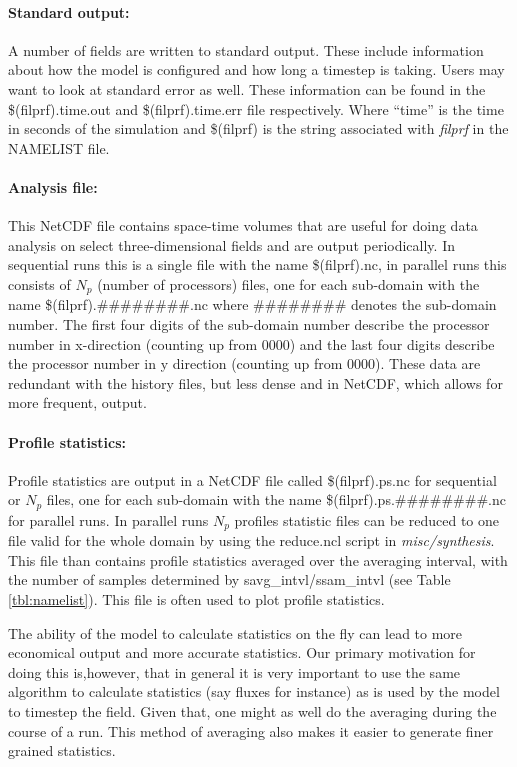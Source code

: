 \documentclass[11pt,a4paper]{article}
\begin{document}
\paragraph{Standard output:}  A number of fields are written to
standard output. These include information about how the model is
configured and how long a timestep is taking. Users may want to look
at standard error as well. These information can be found in the
\$(filprf).time.out and \$(filprf).time.err file respectively.
Where ``time'' is the time in seconds of the simulation and
\$(filprf) is the string associated with \emph{filprf} in
the NAMELIST file.

\paragraph{Analysis file:}  This NetCDF file contains space-time
volumes that are useful for doing data analysis on select 
three-dimensional fields and are output periodically.
In sequential runs this is a single file with the name \$(filprf).nc,
in parallel runs this consists of $N_p$ (number of processors) files,
one for each sub-domain with the name \$(filprf).\#\#\#\#\#\#\#\#.nc
where \#\#\#\#\#\#\#\# denotes the sub-domain number. The first four
digits of the sub-domain number describe the processor number in
x-direction (counting up from 0000) and the last four digits describe
the processor number in y direction (counting up from 0000).
These data are redundant with the history files, but less dense and
in NetCDF, which allows for more frequent, output.

\paragraph{Profile statistics:}  Profile statistics are output in a
NetCDF file called \$(filprf).ps.nc for sequential or $N_p$ files,
one for each sub-domain with the name \$(filprf).ps.\#\#\#\#\#\#\#\#.nc
for parallel runs. In parallel runs $N_p$ profiles statistic files
can be reduced to one file valid for the whole domain by using the
reduce.ncl script in \emph{misc/synthesis}. This file than contains
profile statistics averaged over the averaging interval,
with the number of samples determined by savg\_intvl/ssam\_intvl
(see Table \ref{tbl:namelist}). This file is often used to plot
profile statistics.

The ability of the model to calculate statistics on the fly can
lead to more economical output and more accurate statistics.
Our primary motivation for doing this is,however, that in
general it is very important to use the same algorithm
to calculate statistics (say fluxes for instance) as is used by the
model to timestep the field. Given that, one might as well do the
averaging during the course of a run. This method of averaging also
makes it easier to generate finer grained statistics.
\end{document}
